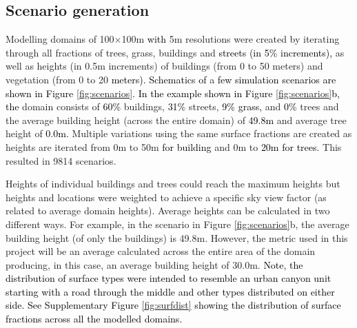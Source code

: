 \documentclass[final,3p,times,authoryear]{elsarticle}
\newcommand{\add}[1]{\textcolor{black}{#1}}
\newcommand{\remove}[1]{\textcolor{red}{\st{}}}
\begin{document}
\subsection{Scenario generation}\label{sec:methodsgen}
Modelling domains of 100$\times$100m \remove{of}\add{with} 5m resolutions were created by iterating through all fractions \remove{(in 5\% increments)}of trees, grass, buildings and \remove{streets,}\add{streets (in 5\% increments),} as well as heights (in 0.5m increments) of buildings (from 0 to 50 meters) and vegetation (from 0 to 20 \remove{meters) (Figure fig:scenarios). For example,}\add{meters). Schematics of} a \remove{single}\add{few simulation scenarios are shown in Figure \ref{fig:scenarios}. In the example shown in Figure \ref{fig:scenarios}b, the}  domain\remove{might} consists of \remove{20\%}\add{60\%} buildings, \remove{30\% grass, 30\%}\add{31\%} streets, \add{9\% grass,} and \remove{20\%}\add{0\%} trees and the average building height (across the entire domain) of \remove{4.5m}\add{49.8m} and average tree height of \remove{3.0m and}\add{0.0m.} Multiple variations using the same surface fractions are created as \remove{as building}heights are iterated from 0m to 50m \add{for building} and\remove{trees} 0m to \remove{20m.}\add{20m for trees.} This resulted in 9814 scenarios.  

\remove{Note, the distribution of surface types were intended to resemble an urban canyon unit starting with a road through the middle and other types distributed on either side. See Supplementary Figure fig:surfdist showing the distribution of surface fractions across all the modelled domains.}Heights of individual buildings and trees could reach the maximum heights but heights and locations were weighted to achieve a specific sky view factor (as related to average domain heights). Average heights can be calculated in two different ways. For example, in the scenario in Figure \ref{fig:scenarios}b, the average building height (of only the buildings) is 49.8m. However, the metric used in this project will be an average calculated across the entire area of the domain producing, in this case, an average building height of 30.0m. \add{Note, the distribution of surface types were intended to resemble an urban canyon unit starting with a road through the middle and other types distributed on either side. See Supplementary Figure \ref{fig:surfdist} showing the distribution of surface fractions across all the modelled domains.}
\end{document}
